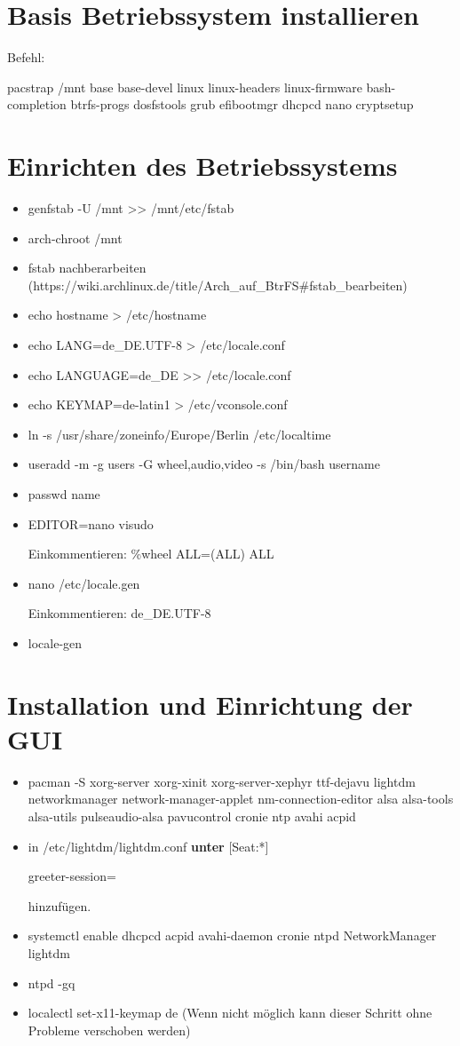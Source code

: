 \documentclass[11pt,a4paper]{article}
\begin{document}
\section{Basis Betriebssystem installieren}
Befehl:

pacstrap /mnt base base-devel linux linux-headers linux-firmware  \textcolor{red}{} bash-completion btrfs-progs dosfstools grub efibootmgr dhcpcd nano cryptsetup
\section{Einrichten des Betriebssystems}
\begin{itemize}
\item genfstab -U /mnt >{}> /mnt/etc/fstab
\item arch-chroot /mnt
\item fstab nachberarbeiten (https://wiki.archlinux.de/title/Arch\_auf\_BtrFS\#fstab\_bearbeiten)
\item echo hostname > /etc/hostname
\item echo LANG=de\_DE.UTF-8 > /etc/locale.conf
\item echo LANGUAGE=de\_DE >{}> /etc/locale.conf
\item echo KEYMAP=de-latin1 > /etc/vconsole.conf
\item ln -s /usr/share/zoneinfo/Europe/Berlin /etc/localtime
\item useradd -m -g users -G wheel,audio,video -s /bin/bash username
\item passwd \glqq{}name\grqq{}
\item EDITOR=nano visudo

Einkommentieren: \%wheel ALL=(ALL) ALL
\item nano /etc/locale.gen

Einkommentieren: de\_DE.UTF-8
\item locale-gen

\end{itemize}
\section{Installation und Einrichtung der GUI}
\begin{itemize}
\item pacman -S xorg-server xorg-xinit xorg-server-xephyr ttf-dejavu \textcolor{red}{} lightdm \textcolor{red}{}  networkmanager network-manager-applet nm-connection-editor alsa alsa-tools alsa-utils pulseaudio-alsa pavucontrol cronie ntp avahi acpid
\item in \glqq{}/etc/lightdm/lightdm.conf\grqq{} \textbf{unter} [Seat:*] 

greeter-session=\textcolor{red}{} 

hinzufügen.
\item systemctl enable dhcpcd acpid avahi-daemon cronie ntpd NetworkManager lightdm
\item ntpd -gq
\item localectl set-x11-keymap de (Wenn nicht möglich kann dieser Schritt ohne Probleme verschoben werden)
\end{itemize}
\end{document}
